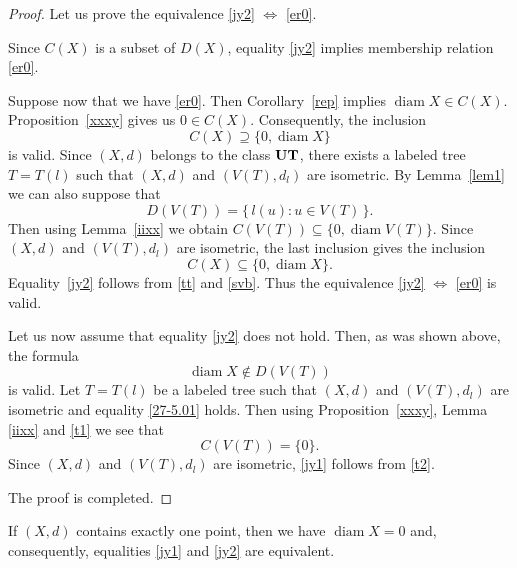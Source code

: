 \documentclass{article}
\begin{document}
\begin{proof} Let us prove the equivalence \eqref{jy2}
$\Leftrightarrow$ \eqref{er0}.

Since $C(X)$ is a subset of $D(X)$, equality \eqref{jy2} implies membership relation \eqref{er0}.

Suppose now that we have \eqref{er0}. Then Corollary~\ref{rep} implies
\(
\operatorname{diam}X\in C(X).
\)
Proposition~\ref{xxxy} gives us
\(
0\in C(X).
\)
Consequently, the inclusion
\begin{equation}
    \label{tt}
C(X)\supseteq\{0,\operatorname{diam}X\}
\end{equation}
is valid.
Since $(X,d)$ belongs to the class ${\bf UT}$, there exists a labeled tree $T=T(l)$  such that $(X,d)$ and $(V(T),d_l)$ are isometric. By Lemma~\ref{lem1} we can also suppose that
\begin{equation}
    \label{27-5.01}
D(V(T))=\{\,l(u)\colon u\in V(T)\,\}.
\end{equation}
Then using Lemma~\ref{iixx} we obtain
\(
C(V(T)) \subseteq \{0,\operatorname{diam} V(T)\}.
\)
Since $(X,d)$ and $(V(T),d_l)$ are isometric, the last inclusion gives the inclusion
\begin{equation}
    \label{svb}
C(X) \subseteq \{0,\operatorname{diam} X\}.
\end{equation}
Equality~\eqref{jy2} follows from \eqref{tt} and \eqref{svb}. Thus the 
equivalence \eqref{jy2}
$\Leftrightarrow$ \eqref{er0} is valid.


Let us now assume that equality \eqref{jy2} does not hold.
Then, as was shown above, the formula
\begin{equation}
    \label{t1}
\operatorname{diam} X \notin D(V(T)) 
\end{equation}
is valid. Let \(T = T(l)\) be a labeled tree such that \((X,d)\)
and \((V(T),d_l)\) are isometric and equality \eqref{27-5.01} holds.
Then using Proposition~\ref{xxxy}, Lemma \ref{iixx} and \eqref{t1} we see that
\begin{equation}
    \label{t2}
C(V(T)) = \{0\}.
\end{equation}
Since \((X,d)\) and \((V(T),d_l)\)
are isometric, \eqref{jy1} follows from \eqref{t2}.

The proof is completed. 
\end{proof}


\begin{Remark}
If $(X,d)$ contains exactly one point, then we have
\(
\operatorname{diam} X = 0
\)
and, consequently, equalities \eqref{jy1} and \eqref{jy2} are equivalent.
\end{Remark}
\end{document}

